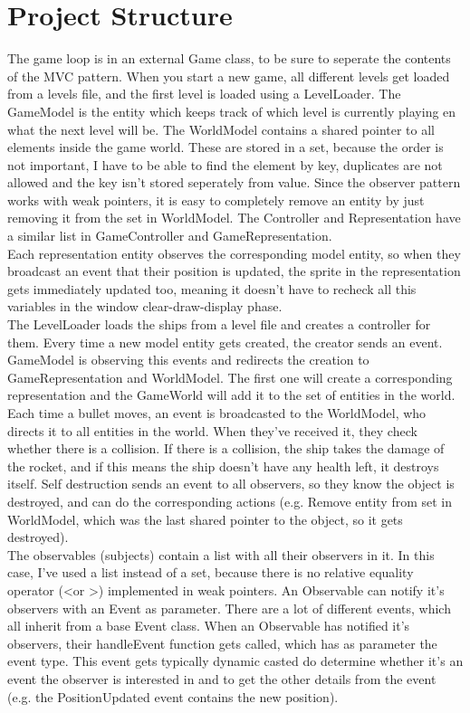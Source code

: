 \documentclass{article}
\begin{document}
    \section{Project Structure}
    The game loop is in an external Game class, to be sure to seperate the contents of the MVC pattern. When you start a new game, all different levels get loaded from a levels file, and the first level is loaded using a LevelLoader. The GameModel is the entity which keeps track of which level is currently playing en what the next level will be. The WorldModel contains a shared pointer to all elements inside the game world. These are stored in a set, because the order is not important, I have to be able to find the element by key, duplicates are not allowed and the key isn't stored seperately from value. Since the observer pattern works with weak pointers, it is easy to completely remove an entity by just removing it from the set in WorldModel. The Controller and Representation have a similar list in GameController and GameRepresentation. \\
    Each representation entity observes the corresponding model entity, so when they broadcast an event that their position is updated, the sprite in the representation gets immediately updated too, meaning it doesn't have to recheck all this variables in the window clear-draw-display phase. \\
    The LevelLoader loads the ships from a level file and creates a controller for them. Every time a new model entity gets created, the creator sends an event. GameModel is observing this events and redirects the creation to GameRepresentation and WorldModel. The first one will create a corresponding representation and the GameWorld will add it to the set of entities in the world. \\
    Each time a bullet moves, an event is broadcasted to the WorldModel, who directs it to all entities in the world. When they've received it, they check whether there is a collision. If there is a collision, the ship takes the damage of the rocket, and if this means the ship doesn't have any health left, it destroys itself. Self destruction sends an event to all observers, so they know the object is destroyed, and can do the corresponding actions (e.g. Remove entity from set in WorldModel, which was the last shared pointer to the object, so it gets destroyed). \\
    The observables (subjects) contain a list with all their observers in it. In this case, I've used a list instead of a set, because there is no relative equality operator (\textless or \textgreater) implemented in weak pointers. An Observable can notify it's observers with an Event as parameter. There are a lot of different events, which all inherit from a base Event class. When an Observable has notified it's observers, their handleEvent function gets called, which has as parameter the event type. This event gets typically dynamic casted do determine whether it's an event the observer is interested in and to get the other details from the event (e.g. the PositionUpdated event contains the new position). \\
\end{document}
